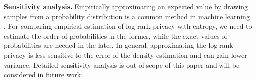 \documentclass[10pt,journal,compsoc]{IEEEtran}
\newcommand{\ts}{\textsuperscript}
\newcommand{\alert}[1]{\textcolor{purple}{#1}}
\begin{document}
\textbf{Sensitivity analysis.} Empirically approximating an expected value by drawing samples from a probability distribution is a common method in machine learning \cite{bishop2006}. For comparing empirical estimation of log-rank privacy with entropy, we need to estimate the order of probabilities in the former, while the exact values of probabilities are needed in the later. In general, approximating the log-rank privacy is less sensitive to the error of the density estimation and can gain lower variance. Detailed sensitivity analysis is out of scope of this paper and will be considered in future work. 
\end{document}
